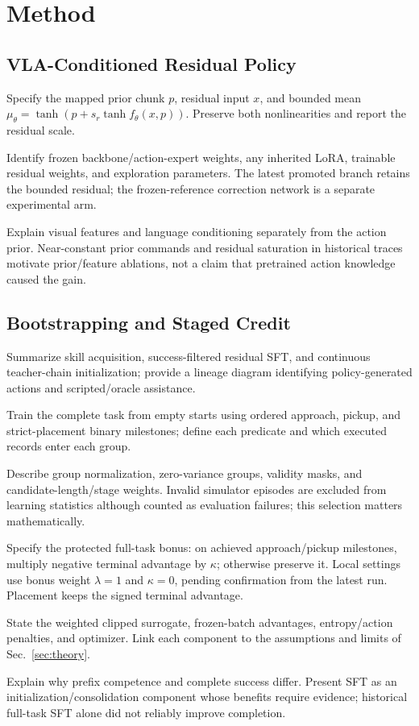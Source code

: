 \section{Method}\label{sec:method}
\subsection{VLA-Conditioned Residual Policy}
\begin{outline}
\item Specify the mapped prior chunk $p$, residual input $x$, and bounded mean $\mu_\theta=\tanh\!\left(p+s_r\tanh f_\theta(x,p)\right)$. Preserve both nonlinearities and report the residual scale.
\item Identify frozen backbone/action-expert weights, any inherited LoRA, trainable residual weights, and exploration parameters. The latest promoted branch retains the bounded residual; the frozen-reference correction network is a separate experimental arm.
\item Explain visual features and language conditioning separately from the action prior. Near-constant prior commands and residual saturation in historical traces motivate prior/feature ablations, not a claim that pretrained action knowledge caused the gain.
\end{outline}
\subsection{Bootstrapping and Staged Credit}
\begin{outline}
\item Summarize skill acquisition, success-filtered residual SFT, and continuous teacher-chain initialization; provide a lineage diagram identifying policy-generated actions and scripted/oracle assistance.
\item Train the complete task from empty starts using ordered approach, pickup, and strict-placement binary milestones; define each predicate and which executed records enter each group.
\item Describe group normalization, zero-variance groups, validity masks, and candidate-length/stage weights. Invalid simulator episodes are excluded from learning statistics although counted as evaluation failures; this selection matters mathematically.
\item Specify the protected full-task bonus: on achieved approach/pickup milestones, multiply negative terminal advantage by $\kappa$; otherwise preserve it. Local settings use bonus weight $\lambda=1$ and $\kappa=0$, pending confirmation from the latest run. Placement keeps the signed terminal advantage.
\item State the weighted clipped surrogate, frozen-batch advantages, entropy/action penalties, and optimizer. Link each component to the assumptions and limits of Sec.~\ref{sec:theory}.
\item Explain why prefix competence and complete success differ. Present SFT as an initialization/consolidation component whose benefits require evidence; historical full-task SFT alone did not reliably improve completion.
\end{outline}

